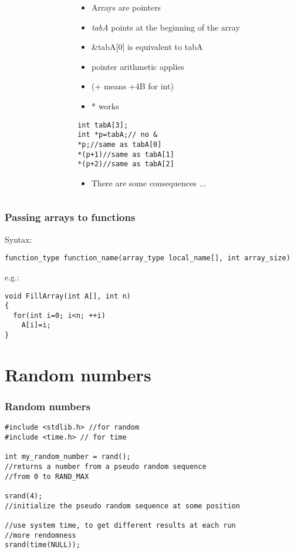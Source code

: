 \documentclass[10pt]{beamer}
\begin{document}
\begin{frame}[fragile]
\begin{columns}
\begin{column}{0.65\textwidth}
\begin{tikzpicture}[x=1.5cm,y=0.3cm]
\end{tikzpicture}
    \end{column}
    \begin{column}{0.5\textwidth}
    \begin{itemize}
      \item Arrays are pointers
      \item \textit{tabA} points at the beginning of the array
      \item \&tabA[0] is equivalent to tabA
      \item pointer arithmetic applies
      \item (+ means +4B for int)
      \item * works
    \end{itemize}
\begin{lstlisting}
int tabA[3];
int *p=tabA;// no &
*p;//same as tabA[0]
*(p+1)//same as tabA[1]
*(p+2)//same as tabA[2]
\end{lstlisting}
\begin{itemize}
  \item There are some consequences ...
\end{itemize}
    \end{column}
  \end{columns}
\end{frame}

\begin{frame}[fragile]
  \frametitle{Passing arrays to functions}
Syntax:
\begin{lstlisting}
function_type function_name(array_type local_name[], int array_size)
\end{lstlisting}

e.g.:
\begin{lstlisting}
void FillArray(int A[], int n)
{
  for(int i=0; i<n; ++i)
    A[i]=i;
}
\end{lstlisting}

\end{frame}

\section{Random numbers}

\begin{frame}[fragile]
  \frametitle{Random numbers}
\begin{lstlisting}
#include <stdlib.h> //for random
#include <time.h> // for time

int my_random_number = rand();
//returns a number from a pseudo random sequence
//from 0 to RAND_MAX

srand(4);
//initialize the pseudo random sequence at some position

//use system time, to get different results at each run
//more rendomness
srand(time(NULL));
\end{lstlisting}

\end{frame}
\end{document}
